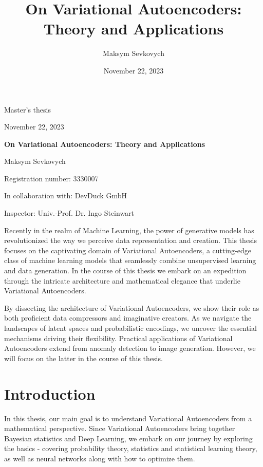 \documentclass[11pt, twoside, a4paper]{book}
\title{On Variational Autoencoders: Theory and Applications}
\date{November 22, 2023}
\author{Maksym Sevkovych}
\theoremstyle{plain}
\theoremstyle{definition}
\theoremstyle{plain}
\begin{document}
\begin{titlepage}
\vspace*{1 cm}
\begin{center}
\LARGE{Master's thesis}

\vspace{0.5 cm}

\large{November 22, 2023}

\vspace{0.5 cm}

\Huge{\textbf{On Variational Autoencoders: Theory and Applications}}

\vspace{0.5 cm}

\Large{Maksym Sevkovych}

\Large{Registration number: 3330007}

\Large{In collaboration with: DevDuck GmbH}
\vspace{1 cm}

\Large{Inspector: Univ.-Prof. Dr. Ingo Steinwart}
\vspace{3cm}
\end{center}
Recently in the realm of Machine Learning, the power of generative models has revolutionized the way we perceive data representation and creation. This thesis focuses on the captivating domain of Variational Autoencoders, a cutting-edge class of machine learning models that seamlessly combine unsupervised learning and data generation. In the course of this thesis we embark on an expedition through the intricate architecture and mathematical elegance that underlie Variational Autoencoders.

By dissecting the architecture of Variational Autoencoders, we show their role as both proficient data compressors and imaginative creators. As we navigate the landscapes of latent spaces and probabilistic encodings, we uncover the essential mechanisms driving their flexibility.
Practical applications of Variational Autoencoders extend from anomaly detection to image generation. However, we will focus on the latter in the course of this thesis.
\end{titlepage}
\newpage
\tableofcontents
\newpage
{}
\section*{Introduction}
In this thesis, our main goal is to understand Variational Autoencoders from a mathematical perspective. Since Variational Autoencoders bring together Bayesian statistics and Deep Learning, we embark on our journey by exploring the basics - covering probability theory, statistics and statistical learning theory, as well as neural networks along with how to optimize them.
\end{document}
